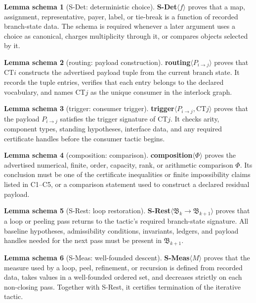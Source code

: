 \documentclass[
  11pt,
]{article}
\theoremstyle{definition}
\newtheorem{lemmaschema}{Lemma schema}[section]
\begin{document}
\begin{lemmaschema}[S-Det: deterministic choice]\label{schema:s-det}
\textbf{S-Det}\(\langle f\rangle\) proves that a map, assignment,
representative, payer, label, or tie-break is a function of recorded
branch-state data.  The schema is required whenever a later argument
uses a choice as canonical, charges multiplicity through it, or compares
objects selected by it.
\end{lemmaschema}

\begin{lemmaschema}[routing: payload construction]\label{schema:s-rout}
\textbf{routing}\(\langle P_{i\to j}\rangle\) proves that CT\(i\)
constructs the advertised payload tuple from the current branch state.
It records the tuple entries, verifies that each entry belongs to the
declared vocabulary, and names CT\(j\) as the unique consumer in the
interlock graph.
\end{lemmaschema}

\begin{lemmaschema}[trigger: consumer trigger]\label{schema:s-trig}
\textbf{trigger}\(\langle P_{i\to j},\mathrm{CT}j\rangle\) proves that
the payload \(P_{i\to j}\) satisfies the trigger signature of CT\(j\).
It checks arity, component types, standing hypotheses, interface data,
and any required certificate handles before the consumer tactic begins.
\end{lemmaschema}

\begin{lemmaschema}[composition: comparison]\label{schema:s-comp}
\textbf{composition}\(\langle \Phi\rangle\) proves the advertised numerical,
finite, order, capacity, rank, or arithmetic comparison \(\Phi\).  Its
conclusion must be one of the certificate inequalities or finite
impossibility claims listed in C1--C5, or a comparison statement used to
construct a declared residual payload.
\end{lemmaschema}

\begin{lemmaschema}[S-Rest: loop restoration]\label{schema:s-rest}
\textbf{S-Rest}\(\langle \mathfrak B_k\to\mathfrak B_{k+1}\rangle\)
proves that a loop or peeling pass returns to the tactic's required
branch-state signature.  All baseline hypotheses, admissibility
conditions, invariants, ledgers, and payload handles needed for the next
pass must be present in \(\mathfrak B_{k+1}\).
\end{lemmaschema}

\begin{lemmaschema}[S-Meas: well-founded descent]\label{schema:s-meas}
\textbf{S-Meas}\(\langle M\rangle\) proves that the measure used by a
loop, peel, refinement, or recursion is defined from recorded data,
takes values in a well-founded ordered set, and decreases strictly on
each non-closing pass.  Together with S-Rest, it certifies termination of
the iterative tactic.
\end{lemmaschema}
\end{document}
